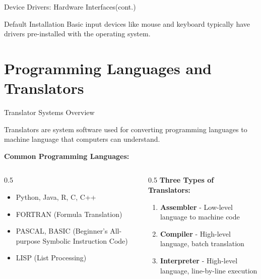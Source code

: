 \documentclass[aspectratio=169]{beamer}
\begin{document}
\begin{frame}{Device Drivers: Hardware Interfaces(cont.)}
 
   
    \begin{exampleblock}{Default Installation}
        Basic input devices like mouse and keyboard typically have drivers pre-installed with the operating system.
    \end{exampleblock}
\end{frame}

\section{Programming Languages and Translators}

\begin{frame}{Translator Systems Overview}
    \begin{definition}
        Translators are system software used for converting programming languages to machine language that computers can understand.
    \end{definition}
     
    \textbf{Common Programming Languages:}
    \begin{columns}
        \begin{column}{0.5\textwidth}
            \begin{itemize}
                \item Python, Java, R, C, C++
                \item FORTRAN (Formula Translation)
                \item PASCAL, BASIC (Beginner's All-purpose Symbolic Instruction Code)
                \item LISP (List Processing)
            \end{itemize}
        \end{column}
        \begin{column}{0.5\textwidth}
             \textbf{Three Types of Translators:}
    \begin{enumerate}
        \item \textbf{Assembler} - Low-level language to machine code
        \item \textbf{Compiler} - High-level language, batch translation
        \item \textbf{Interpreter} - High-level language, line-by-line execution
    \end{enumerate}
        \end{column}
    \end{columns}

    
\end{frame}
\end{document}
